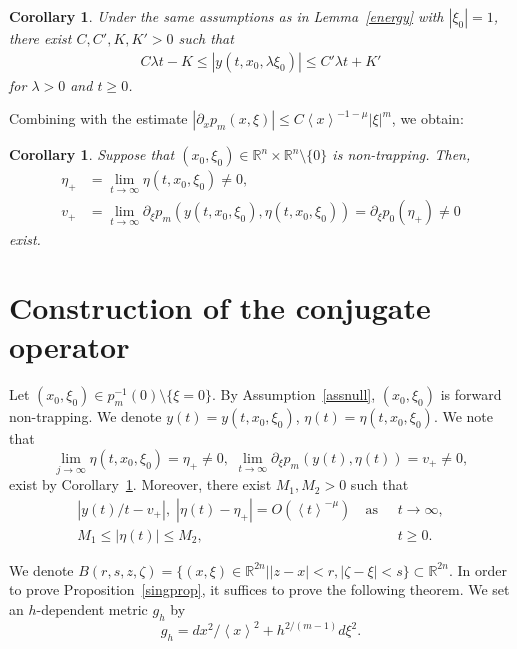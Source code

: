 \documentclass[10pt]{amsart}
\newtheorem{coro}[cdrthm]{Corollary}
\theoremstyle{definition}
\renewcommand*\l{\lambda}
\newcommand*\m{\mu}
\newcommand*\x{\xi}
\newcommand*\y{\eta}
\newcommand*\z{\zeta}
\newcommand*\re{\mathbb{R}}
\newcommand*\pa{\partial}
\newcommand{\jap}[1]{\left\langle #1 \right\rangle}
\begin{document}
\begin{coro}
Under the same assumptions as in Lemma~\ref{energy} with $|\x_0|=1$, there exist $C,C',K,K'>0$ such that
\begin{align*}
C\l t -K\leq |y(t,x_0,\l\x_0)|\leq C'\l t+K'
\end{align*}
for $\l>0$ and $t\geq 0$.
\end{coro}

Combining with the estimate $|\pa_{x}p_m(x,\x)|\leq C\jap{x}^{-1-\m}|\x|^{m}$, we obtain:
\begin{coro}\label{asymmom}
Suppose that $(x_0,\x_0)\in \re^n\times \re^n\setminus\{0\}$ is non-trapping. Then,
\begin{align*}
\y_{+}&=\lim_{t\to\infty}\y(t,x_0,\x_0)\neq 0,\\
v_{+}&=\lim_{t\to\infty}\pa_{\x}p_m\left(y(t,x_0,\x_0),\y(t,x_0,\x_0)\right)=\pa_{\x}p_0(\y_+)\neq 0
\end{align*}
exist.
\end{coro}


\section{Construction of the conjugate operator}\label{appb}

Let $(x_0,\x_0)\in p_m^{-1}(0)\setminus\{\x= 0\}$. By Assumption~\ref{assnull}, $(x_0,\x_0)$ is forward non-trapping. We denote $y(t) = y(t, x_0, \x_0)$, $\y(t) = \y(t, x_0, \x_0)$. We note that
\[
\lim_{j\to\infty}\y(t,x_0,\x_0)=\y_+\neq 0,\,\, \lim_{t\to \infty} \pa_{\x}p_m(y(t),\y(t)) = v_+\neq 0,
\]
exist by Corollary~\ref{asymmom}. Moreover, there exist $M_1, M_2>0$ such that
\begin{equation}\label{cl}
\begin{aligned}
|y(t)/t-v_+|,\; |\y(t)-\y_+|=O(\jap{t}^{-\m})\quad\text{as }\;&t\to\infty,\\
M_1\leq|\y(t)|\leq M_2,\quad &t\geq 0.
\end{aligned}
\end{equation}

We denote $B(r,s,z,\z) = \{(x,\x)\in \re^{2n}| |z-x| < r, |\z -\x| < s\}\subset \re^{2n}$. In order to prove Proposition~\ref{singprop}, it suffices to prove the following theorem. We set an $h$-dependent metric $g_h$ by
\[
g_h = dx^2/\jap{x}^2+h^{2/(m-1)}d\x^2.
\]
\end{document}
